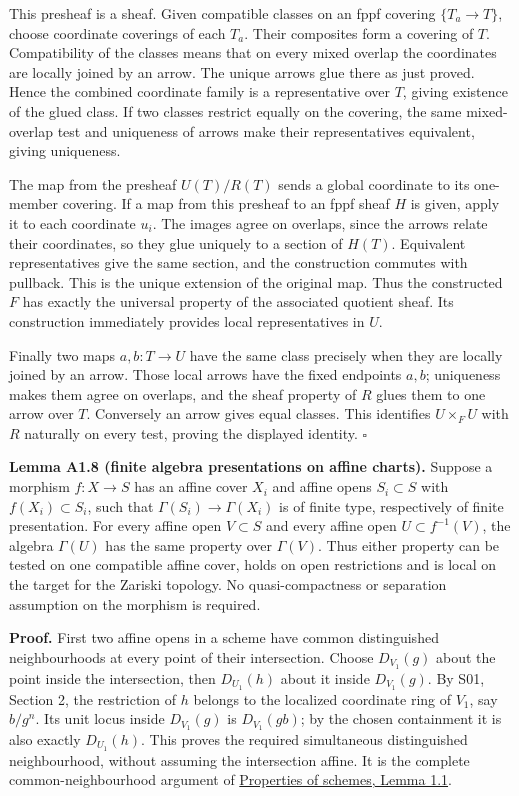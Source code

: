 \documentclass[11pt,a4paper,openany]{report}
\begin{document}
This presheaf is a sheaf. Given compatible classes on an fppf covering \(\{T_a\to T\}\), choose coordinate coverings of each \(T_a\). Their composites form a covering of \(T\). Compatibility of the classes means that on every mixed overlap the coordinates are locally joined by an arrow. The unique arrows glue there as just proved. Hence the combined coordinate family is a representative over \(T\), giving existence of the glued class. If two classes restrict equally on the covering, the same mixed-overlap test and uniqueness of arrows make their representatives equivalent, giving uniqueness.

The map from the presheaf \(U(T)/R(T)\) sends a global coordinate to its one-member covering. If a map from this presheaf to an fppf sheaf \(H\) is given, apply it to each coordinate \(u_i\). The images agree on overlaps, since the arrows relate their coordinates, so they glue uniquely to a section of \(H(T)\). Equivalent representatives give the same section, and the construction commutes with pullback. This is the unique extension of the original map. Thus the constructed \(F\) has exactly the universal property of the associated quotient sheaf. Its construction immediately provides local representatives in \(U\).

Finally two maps \(a,b:T\to U\) have the same class precisely when they are locally joined by an arrow. Those local arrows have the fixed endpoints \(a,b\); uniqueness makes them agree on overlaps, and the sheaf property of \(R\) glues them to one arrow over \(T\). Conversely an arrow gives equal classes. This identifies \(U\times_FU\) with \(R\) naturally on every test, proving the displayed identity. \(\square\)

\label{AG-RG-S04-affine-presentation-communication}

\textbf{Lemma A1.8 (finite algebra presentations on affine charts).} Suppose a morphism \(f:X\to S\) has an affine cover \(X_i\) and affine opens \(S_i\subset S\) with \(f(X_i)\subset S_i\), such that \(\Gamma(S_i)\to\Gamma(X_i)\) is of finite type, respectively of finite presentation. For every affine open \(V\subset S\) and every affine open \(U\subset f^{-1}(V)\), the algebra \(\Gamma(U)\) has the same property over \(\Gamma(V)\). Thus either property can be tested on one compatible affine cover, holds on open restrictions and is local on the target for the Zariski topology. No quasi-compactness or separation assumption on the morphism is required.

\textbf{Proof.} First two affine opens in a scheme have common distinguished neighbourhoods at every point of their intersection. Choose \(D_{V_1}(g)\) about the point inside the intersection, then \(D_{U_1}(h)\) about it inside \(D_{V_1}(g)\). By S01, Section 2, the restriction of \(h\) belongs to the localized coordinate ring of \(V_1\), say \(b/g^n\). Its unit locus inside \(D_{V_1}(g)\) is \(D_{V_1}(gb)\); by the chosen containment it is also exactly \(D_{U_1}(h)\). This proves the required simultaneous distinguished neighbourhood, without assuming the intersection affine. It is the complete common-neighbourhood argument of \href{https://github.com/KokunoYumeto/open-math-courses/blob/main/docs/courses/AG-SS/properties-of-schemes.html}{Properties of schemes, Lemma 1.1}.
\end{document}
